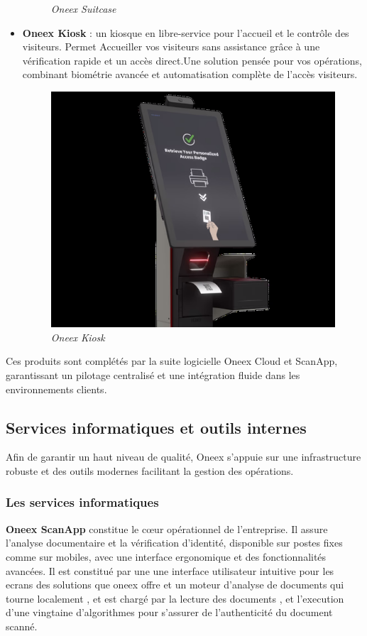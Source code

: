 \begin{itemize}
\begin{figure}[ht]
		      \caption{\textit{Oneex Suitcase}}
		      \label{fig:Oneex Suitcase}
	      \end{figure}
	\item \textbf{Oneex Kiosk} : un kiosque en libre-service pour l’accueil et le contrôle des visiteurs. Permet Accueiller vos visiteurs sans assistance grâce à une vérification rapide et un accès direct.Une solution pensée pour vos opérations, combinant biométrie avancée et automatisation complète de l’accès visiteurs.
	      \begin{figure}[ht]
		      \centering
		      \includegraphics[width=.5\textwidth]{figures/Oneex kiosk.png}
		      \caption{\textit{Oneex Kiosk}}
		      \label{fig:Oneex Kiosk}
	      \end{figure}
\end{itemize}

Ces produits sont complétés par la suite logicielle Oneex Cloud et ScanApp, garantissant un pilotage centralisé et une intégration fluide dans les environnements clients.

\subsection{Services informatiques et outils internes}

Afin de garantir un haut niveau de qualité, Oneex s’appuie sur une infrastructure robuste et des outils modernes facilitant la gestion des opérations.

\subsubsection{Les services informatiques}

\textbf{Oneex ScanApp} constitue le cœur opérationnel de l’entreprise. Il assure l’analyse documentaire et la vérification d’identité, disponible sur postes fixes comme sur mobiles, avec une interface ergonomique et des fonctionnalités avancées. Il est constitué par une une interface utilisateur intuitive pour les ecrans des solutions que oneex offre et un moteur d’analyse de documents qui tourne localement , et est chargé par la lecture des documents , et l'execution d'une vingtaine d'algorithmes pour s'assurer de l'authenticité du document scanné.

